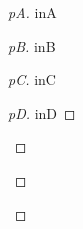 \documentclass{article}
\begin{document}
    \begin{proof}[pA]
        inA
        \begin{proof}[pB]
            inB
            \begin{proof}[pC]
                inC
                \begin{proof}[pD]
                    inD
                \end{proof}
            \end{proof}
        \end{proof}
    \end{proof}
\end{document}
